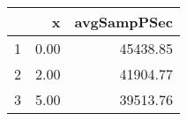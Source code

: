 \begin{table}[h]
\centering
\begin{tabular}{rrr}
  \hline
 & x & avgSampPSec \\ 
  \hline
1 & 0.00 & 45438.85 \\ 
   \hline
2 & 2.00 & 41904.77 \\ 
   \hline
3 & 5.00 & 39513.76 \\ 
   \hline
\end{tabular}
\end{table}
